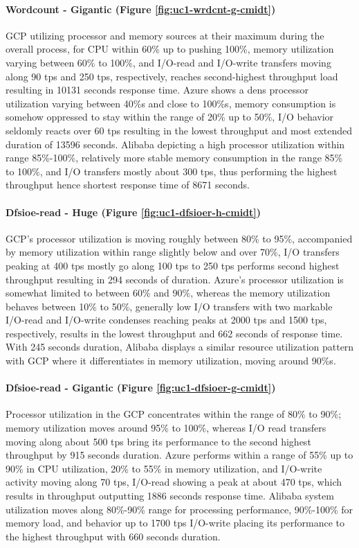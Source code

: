 \documentclass[review]{elsarticle}
\begin{document}
\paragraph{Wordcount - Gigantic (Figure \ref{fig:uc1-wrdcnt-g-cmidt})}GCP utilizing processor and memory sources at their maximum during the overall process, for CPU within 60\% up to pushing 100\%, memory utilization varying between 60\% to 100\%, and I/O-read and I/O-write transfers moving along 90 tps and 250 tps, respectively, reaches second-highest throughput load resulting in 10131 seconds response time. Azure shows a dens processor utilization varying between 40\%s and close to 100\%s, memory consumption is somehow oppressed to stay within the range of 20\% up to 50\%, I/O behavior seldomly reacts over 60 tps resulting in the lowest throughput and most extended duration of 13596 seconds. Alibaba depicting a high processor utilization within range 85\%-100\%, relatively more stable memory consumption in the range 85\% to 100\%, and I/O transfers mostly about 300 tps, thus performing the highest throughput hence shortest response time of 8671 seconds.

\paragraph{Dfsioe-read - Huge (Figure \ref{fig:uc1-dfsioer-h-cmidt})}GCP's processor utilization is moving roughly between 80\% to 95\%, accompanied by memory utilization within range slightly below and over 70\%, I/O transfers peaking at 400 tps mostly go along 100 tps to 250 tps performs second highest throughput resulting in 294 seconds of duration. Azure's processor utilization is somewhat limited to between 60\% and 90\%, whereas the memory utilization behaves between 10\% to 50\%, generally low I/O transfers with two markable I/O-read and I/O-write condenses reaching peaks at 2000 tps and 1500 tps, respectively, results in the lowest throughput and 662 seconds of response time. With 245 seconds duration, Alibaba displays a similar resource utilization pattern with GCP where it differentiates in memory utilization, moving around 90\%s.

\paragraph{Dfsioe-read - Gigantic (Figure \ref{fig:uc1-dfsioer-g-cmidt})}Processor utilization in the GCP concentrates within the range of 80\% to 90\%; memory utilization moves around 95\% to 100\%, whereas I/O read transfers moving along about 500 tps bring its performance to the second highest throughput by 915 seconds duration. Azure performs within a range of 55\% up to 90\% in CPU utilization, 20\% to 55\% in memory utilization, and I/O-write activity moving along 70 tps, I/O-read showing a peak at about 470 tps, which results in throughput outputting 1886 seconds response time. Alibaba system utilization moves along 80\%-90\% range for processing performance, 90\%-100\% for memory load, and behavior up to 1700 tps I/O-write placing its performance to the highest throughput with 660 seconds duration.
\end{document}
